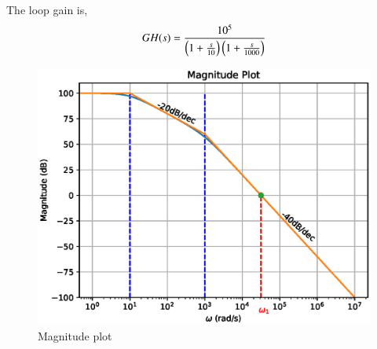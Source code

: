 \begin{enumerate}[label=\arabic*.,ref=\theenumi]
The loop gain is, 
\begin{align}
    GH(s) = \frac{10^5}{\left(1+\frac{s}{10}\right)\left(1 + \frac{s}{1000}\right)}
\end{align}

\begin{figure}[!ht]
    \centering
    \includegraphics[width=\columnwidth]{./figs/ee18btech11028/fig_1.eps}
    \caption{Magnitude plot}
    \label{fig:ee18btech11028_2_1}
\end{figure}



\end{enumerate}
